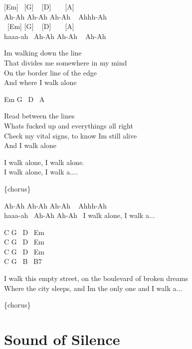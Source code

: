 \documentclass[
  letterpaper,
  twoside=false]{scrbook}
\begin{document}
{[}Em{]} ~{[}G{]} ~ {[}D{]} ~ ~ {[}A{]}\\
Ah-Ah Ah-Ah Ah-Ah ~ Ahhh-Ah\\
\hspace*{0.333em} ~{[}Em{]} {[}G{]} ~ {[}D{]} ~ ~ {[}A{]}\\
haaa-ah ~Ah-Ah Ah-Ah ~ Ah-Ah

I\textquotesingle m walking down the line\\
That divides me somewhere in my mind\\
On the border line of the edge\\
And where I walk alone

Em G ~D ~A

Read between the lines\\
What\textquotesingle s fucked up and everything\textquotesingle s all
right\\
Check my vital signs, to know I\textquotesingle m still alive\\
And I walk alone

I walk alone, I walk alone.\\
I walk alone, I walk a....

\{chorus\}

Ah-Ah Ah-Ah Ah-Ah ~ Ahhh-Ah\\
haaa-ah ~Ah-Ah Ah-Ah ~I walk alone, I walk a...

C G ~D ~Em\\
C G ~D ~Em\\
C G ~D ~Em\\
C G ~B ~B7

I walk this empty street, on the boulevard of broken dreams\\
Where the city sleeps, and I\textquotesingle m the only one and I walk
a...

\{chorus\}

\hypertarget{sound-of-silence}{%
\chapter{Sound of Silence}\label{sound-of-silence}}
\end{document}
